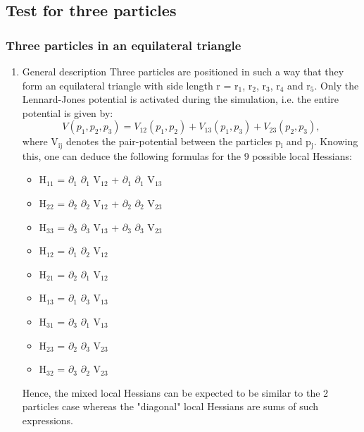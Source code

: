 \documentclass[11pt]{article}
\begin{document}
\subsection{Test for three particles}
\label{sec-1-5}
\subsubsection{Three particles in an equilateral triangle}
\label{sec-1-5-1}
\begin{enumerate}
\item General description
\label{sec-1-5-1-1}
Three particles are positioned in such a way that they form an equilateral triangle with side length r = r$_{\text{1}}$, r$_{\text{2}}$, r$_{\text{3}}$, r$_{\text{4}}$ and r$_{\text{5}}$.
Only the Lennard-Jones potential is activated during the simulation, i.e. the entire potential is given by:
\[
V(p_1, p_2, p_3) = V_{12}(p_1, p_2) + V_{13}(p_1, p_3) + V_{23}(p_2, p_3),
\]
where V$_{\text{ij}}$ denotes the pair-potential between the particles p$_{\text{i}}$ and p$_{\text{j}}$.
Knowing this, one can deduce the following formulas for the 9 possible local Hessians:
\begin{itemize}
\item H$_{\text{11}}$ = $\partial$$_{\text{1}}$ $\partial$$_{\text{1}}$ V$_{\text{12}}$ + $\partial$$_{\text{1}}$ $\partial$$_{\text{1}}$ V$_{\text{13}}$
\item H$_{\text{22}}$ = $\partial$$_{\text{2}}$ $\partial$$_{\text{2}}$ V$_{\text{12}}$ + $\partial$$_{\text{2}}$ $\partial$$_{\text{2}}$ V$_{\text{23}}$
\item H$_{\text{33}}$ = $\partial$$_{\text{3}}$ $\partial$$_{\text{3}}$ V$_{\text{13}}$ + $\partial$$_{\text{3}}$ $\partial$$_{\text{3}}$ V$_{\text{23}}$
\item H$_{\text{12}}$ = $\partial$$_{\text{1}}$ $\partial$$_{\text{2}}$ V$_{\text{12}}$
\item H$_{\text{21}}$ = $\partial$$_{\text{2}}$ $\partial$$_{\text{1}}$ V$_{\text{12}}$
\item H$_{\text{13}}$ = $\partial$$_{\text{1}}$ $\partial$$_{\text{3}}$ V$_{\text{13}}$
\item H$_{\text{31}}$ = $\partial$$_{\text{3}}$ $\partial$$_{\text{1}}$ V$_{\text{13}}$
\item H$_{\text{23}}$ = $\partial$$_{\text{2}}$ $\partial$$_{\text{3}}$ V$_{\text{23}}$
\item H$_{\text{32}}$ = $\partial$$_{\text{3}}$ $\partial$$_{\text{2}}$ V$_{\text{23}}$
\end{itemize}
Hence, the mixed local Hessians can be expected to be similar to the 2 particles case whereas the "diagonal" local Hessians are sums of such expressions.
\end{enumerate}
\end{document}

